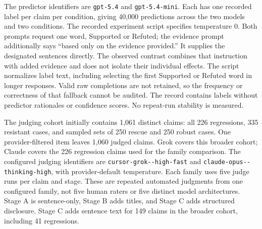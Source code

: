 \documentclass[11pt,letterpaper]{article}
\begin{document}
The predictor identifiers are \texttt{gpt-5.4} and \texttt{gpt-5.4-mini}. Each has one recorded label per claim per condition, giving 40,000 predictions across the two models and two conditions. The recorded experiment script specifies temperature 0. Both prompts request one word, Supported or Refuted; the evidence prompt additionally says ``based only on the evidence provided.'' It supplies the designated sentences directly. The observed contrast combines that instruction with added evidence and does not isolate their individual effects. The script normalizes label text, including selecting the first Supported or Refuted word in longer responses. Valid raw completions are not retained, so the frequency or correctness of that fallback cannot be audited. The record contains labels without predictor rationales or confidence scores. No repeat-run stability is measured.

The judging cohort initially contains 1,061 distinct claims: all 226 regressions, 335 resistant cases, and sampled sets of 250 rescue and 250 robust cases. One provider-filtered item leaves 1,060 judged claims. Grok covers this broader cohort; Claude covers the 226 regression claims used for the family comparison. The configured judging identifiers are \texttt{cursor-\allowbreak grok--\allowbreak high-\allowbreak fast} and \texttt{claude-\allowbreak opus--\allowbreak thinking-\allowbreak high}, with provider-default temperature. Each family uses five judge runs per claim and stage. These are repeated automated judgments from one configured family, not five human raters or five distinct model architectures. Stage A is sentence-only, Stage B adds titles, and Stage C adds structured disclosure. Stage C adds sentence text for 149 claims in the broader cohort, including 41 regressions.
\end{document}
